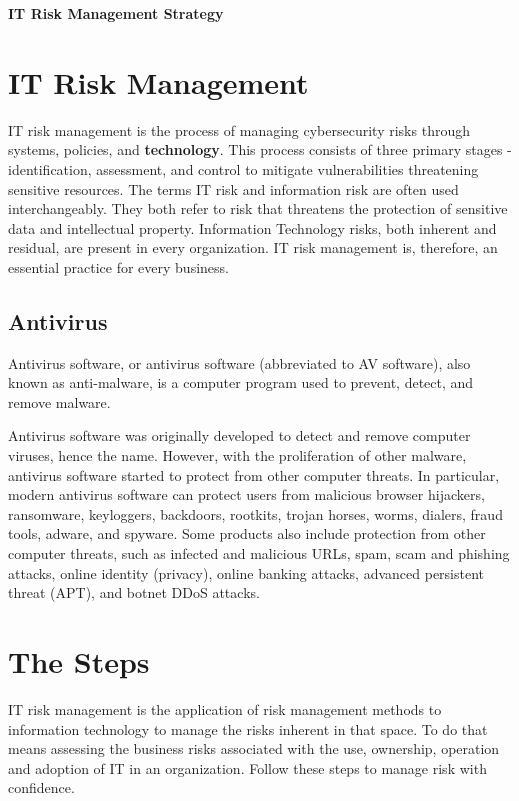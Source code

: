 \documentclass[a4paper,12pt]{article}
\begin{document}
\textbf{IT Risk Management Strategy}

\tableofcontents
\clearpage

\section{IT Risk Management}

IT risk management is the process of managing cybersecurity risks through systems, policies, and \textbf{technology}. This process consists of three primary stages - identification, assessment, and control to mitigate vulnerabilities threatening sensitive resources.
The terms IT risk and information risk are often used interchangeably. They both refer to risk that threatens the protection of sensitive data and intellectual property. Information Technology risks, both inherent and residual, are present in every organization. IT risk management is, therefore, an essential practice for every business.

\subsection{Antivirus}
Antivirus software, or antivirus software (abbreviated to AV software), also known as anti-malware,
is a computer program used to prevent, detect, and remove malware.

Antivirus software was originally developed to detect and remove computer viruses, hence the name. However, with the
proliferation of other malware, antivirus software started to protect from other computer threats. In particular, modern antivirus software can protect users from malicious browser hijackers, ransomware, keyloggers, backdoors, rootkits, trojan horses, worms, dialers, fraud tools, adware, and spyware. Some products also include protection from other computer threats, such as infected and malicious URLs, spam, scam and phishing attacks, online identity (privacy), online banking attacks, advanced persistent threat (APT), and botnet DDoS attacks.

 \clearpage 

\section{The Steps}

IT risk management is the application of risk management methods to information technology to manage the risks inherent in that space. To do that means assessing the business risks associated with the use, ownership, operation and adoption of IT in an organization. Follow these steps to manage risk with confidence.
\end{document}
